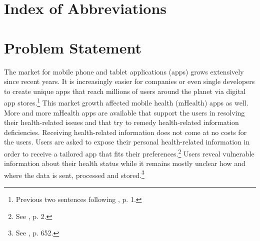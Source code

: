 \documentclass[
	a4paper,
	oneside,
	12pt,
	liststotocnumbered
]{article}
\let\cite\textcite
\begin{document}
\renewcommand{\figurename}{Figure}
\renewcommand{\tablename}{Table}
\renewcommand\thefigure{\arabic{section}-\arabic{figure}}
\renewcommand\thetable{Tab. \arabic{section}-\arabic{table}}
\newcommand{\todo}[1]{\textbf{\textsc{\textcolor{red}{TODO: #1}}}}

\newcommand{\mH}{mHealth }
\newcommand{\ap}{app provider }
\newcommand{\pp}{privacy policy }
\newcommand{\pps}{privacy policies }
\newcommand{\sca}{static code analysis }
\newcommand{\Sca}{Static code analysis }
\newcommand{\pra}{privacy risk assessment }
\newcommand{\prfs}{privacy risk factors }




\tableofcontents
\newpage

\section*{Index of Abbreviations}
\begin{acronym}[TTTTTTTTTTTTTTTTTTTT]
\end{acronym}
\newpage

\normalsize
{}

\section{Problem Statement}
The market for mobile phone and tablet applications (apps) grows extensively since recent years.
It is increasingly easier for companies or even single developers to create unique apps that reach millions of users around the planet via digital app stores.\footnote{Previous two sentences following \cite{Enck2011}, p. 1.}
This market growth affected mobile health (\acs{mHealth}) apps as well. 
More and more \mH apps are available that support the users in resolving their health-related issues and that try to remedy health-related information deficiencies. 
Receiving health-related information does not come at no costs for the users.
Users are asked to expose their personal health-related information in order to receive a tailored app that fits their preferences.\footnote{See \cite{Chen2012}, p. 2.}
Users reveal vulnerable information about their health status while it remains mostly unclear how and where the data is sent, processed and stored.\footnote{See \cite{He2014}, p. 652.}
\end{document}
